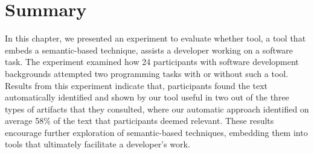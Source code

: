 \section{Summary}
\label{cp6:summary}



In this chapter, we presented an experiment to evaluate whether \acs{tool},
 a tool that embeds a semantic-based technique, assists a developer working on a software task. 
The experiment examined how 24 participants with software development backgrounds attempted 
two programming tasks with or without such a tool. 
Results from this experiment indicate that, 
participants found the text automatically identified and shown by our tool useful in two 
out of the three types of artifacts that they consulted, where our automatic approach identified on average 58\% of the text that participants deemed relevant. 
These results encourage further exploration of semantic-based techniques, 
embedding them into tools that ultimately facilitate a developer's work.